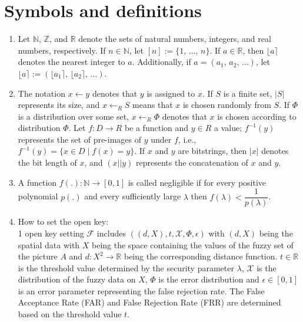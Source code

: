 \documentclass[graybox]{svmult}
\begin{document}
\section{Symbols and definitions}
\begin{enumerate}[label=(\roman*), itemsep=1em]
    \item Let \( \mathbb{N} \), \( \mathbb{Z} \), and \( \mathbb{R} \) denote the sets of natural numbers, integers, and real numbers, respectively. If \( n \in \mathbb{N} \), let \( [n] := \{1,\, \ldots,\, n\} \). If \( a \in \mathbb{R} \), then \( \lfloor a \rceil \) denotes the nearest integer to \( a \). Additionally, if \( a = (a_1,\, a_2,\, \ldots) \), let \( \lfloor a \rceil := (\lfloor a_1 \rceil,\, \lfloor a_2 \rceil,\, \ldots) \).
    \item The notation \( x \leftarrow y \) denotes that \( y \) is assigned to \( x \). If \( S \) is a finite set, \( |S| \) represents its size, and \( x \leftarrow_{{R}}   S \) means that \( x \) is chosen randomly from \( S \). If \( \varPhi \) is a distribution over some set, \( x \leftarrow_R \varPhi \) denotes that \( x \) is chosen according to distribution \( \varPhi \). Let \( f: D \rightarrow R \) be a function and \( y \in R \) a value; \( { f^{-1}(y) } \) represents the set of pre-images of \( y \) under \( f \), i.e., \( { f^{-1}(y) = \{x \in D \mid f(x) = y\} } \). If \( x \) and \( y \) are bitstrings, then \( |x| \) denotes the bit length of \( x \), and \( (x || y) \) represents the concatenation of \( x \) and \( y \).
    \item A function \( f(.): \mathbb{N} \rightarrow [0, 1] \) is called negligible if for every positive polynomial \( p(.) \) and every sufficiently large \( \lambda \) then \( f(\lambda) < \dfrac{1}{p(\lambda)} \).
    \item How to set the open key: \\
          1 open key setting \( \mathcal{F} \) includes \( ((d, X), t, \mathcal{X}  , \varPhi, \epsilon) \) with \( (d, X) \) being the \allowbreak spatial data with \( X \) being the space containing the values of the fuzzy set of the \allowbreak picture \( A \) and \( d : X^2 \to \mathbb{R} \) being the corresponding distance function. \( t \in \mathbb{R} \) is the \allowbreak threshold value determined by the security parameter \( \lambda \), \( \mathcal{X} \) is the \allowbreak distribution of the fuzzy data on \( X \), \( \varPhi \) is the error distribution and \( \epsilon \in [0,1] \) is an error \allowbreak parameter representing the false rejection rate. The False Acceptance Rate (FAR) and False Rejection Rate (FRR) are determined based on the threshold value \( t \).\\[6pt]

\end{enumerate}
\end{document}
